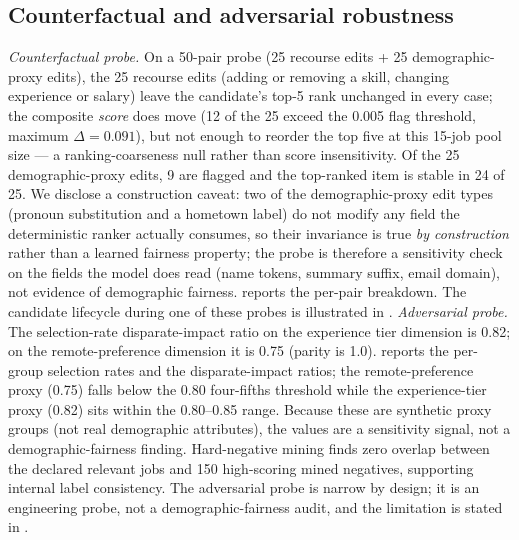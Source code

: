 \subsection{Counterfactual and adversarial robustness}\label{sec:5.4}
\emph{Counterfactual probe.} On a 50-pair probe (25 recourse edits + 25 demographic-proxy edits), the 25 recourse edits (adding or removing a skill, changing experience or salary) leave the candidate's top-5 rank unchanged in every case; the composite \emph{score} does move (12 of the 25 exceed the 0.005 flag threshold, maximum $\Delta = 0.091$), but not enough to reorder the top five at this 15-job pool size --- a ranking-coarseness null rather than score insensitivity. Of the 25 demographic-proxy edits, 9 are flagged and the top-ranked item is stable in 24 of 25.
We disclose a construction caveat: two of the demographic-proxy edit types (pronoun substitution and a hometown label) do not modify any field the deterministic ranker actually consumes, so their invariance is true \emph{by construction} rather than a learned fairness property; the probe is therefore a sensitivity check on the fields the model does read (name tokens, summary suffix, email domain), not evidence of demographic fairness.
 reports the per-pair breakdown.
The candidate lifecycle during one of these probes is illustrated in .
\emph{Adversarial probe.} The selection-rate disparate-impact ratio on the experience tier dimension is 0.82; on the remote-preference dimension it is 0.75 (parity is 1.0).
 reports the per-group selection rates and the disparate-impact ratios; the remote-preference proxy (0.75) falls below the 0.80 four-fifths threshold while the experience-tier proxy (0.82) sits within the 0.80--0.85 range. Because these are synthetic proxy groups (not real demographic attributes), the values are a sensitivity signal, not a demographic-fairness finding.
Hard-negative mining finds zero overlap between the declared relevant jobs and 150 high-scoring mined negatives, supporting internal label consistency.
The adversarial probe is narrow by design; it is an engineering probe, not a demographic-fairness audit, and the limitation is stated in .

